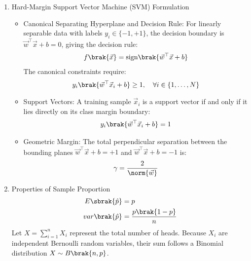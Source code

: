 \begin{enumerate}[label=\thesubsection.\arabic*, ref=\thesubsection.\theenumi]
\item Hard-Margin Support Vector Machine (SVM) Formulation
\begin{itemize}
	\item Canonical Separating Hyperplane and Decision Rule:
	For linearly separable data with labels $y_i \in \{-1, +1\}$, the decision boundary is $\vec{w}^\top \vec{x} + b = 0$, giving the decision rule:
	\begin{align}
		f\brak{\vec{x}} = \text{sign}\brak{\vec{w}^\top \vec{x} + b}
	\end{align}
	The canonical constraints require:
	\begin{align}
		y_i\brak{\vec{w}^\top \vec{x}_i + b} \ge 1, \quad \forall i \in \{1, \dots, N\} \label{eq:DA2025-svm_canonical_constraint}
	\end{align}
	
	\item Support Vectors:
	A training sample $\vec{x}_i$ is a support vector if and only if it lies directly on its class margin boundary:
	\begin{align}
		y_i\brak{\vec{w}^\top \vec{x}_i + b} = 1 \label{eq:DA2025-svm_sv_def}
	\end{align}
	
	\item Geometric Margin:
	The total perpendicular separation between the bounding planes $\vec{w}^\top \vec{x} + b = +1$ and $\vec{w}^\top \vec{x} + b = -1$ is:
	\begin{align}
		\gamma = \frac{2}{\norm{\vec{w}}} \label{eq:DA2025-svm_margin_width}
	\end{align}
\end{itemize}
	\item Properties of Sample Proportion
	\begin{align}
		E\sbrak{\hat{p}} &= p \label{eq:DA2025-sample_prop_mean}
		\\
		var\brak{\hat{p}} &= \frac{p\brak{1-p}}{n} \label{eq:DA2025-sample_prop_var}
	\end{align}
	\solution
	Let $X = \sum_{i=1}^n X_i$ represent the total number of heads. Because $X_i$ are independent Bernoulli random variables, their sum follows a Binomial distribution $X \sim B\brak{n, p}$.
	

\end{enumerate}
